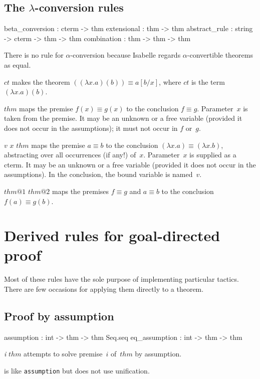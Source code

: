 \subsection{The $\lambda$-conversion rules}
\begin{ttbox} 
beta_conversion : cterm -> thm
extensional     : thm -> thm
abstract_rule   : string -> cterm -> thm -> thm
combination     : thm -> thm -> thm
\end{ttbox} 
There is no rule for $\alpha$-conversion because Isabelle regards
$\alpha$-convertible theorems as equal.
\begin{ttdescription}
\item[\ttindexbold{beta_conversion} $ct$] 
makes the theorem $((\lambda x.a)(b)) \equiv a[b/x]$, where $ct$ is the
term $(\lambda x.a)(b)$.

\item[\ttindexbold{extensional} $thm$] 
maps the premise $f(x) \equiv g(x)$ to the conclusion $f\equiv g$.
Parameter~$x$ is taken from the premise.  It may be an unknown or a free
variable (provided it does not occur in the assumptions); it must not occur
in $f$ or~$g$.

\item[\ttindexbold{abstract_rule} $v$ $x$ $thm$] 
maps the premise $a\equiv b$ to the conclusion $(\lambda x.a) \equiv
(\lambda x.b)$, abstracting over all occurrences (if any!) of~$x$.
Parameter~$x$ is supplied as a cterm.  It may be an unknown or a free
variable (provided it does not occur in the assumptions).  In the
conclusion, the bound variable is named~$v$.

\item[\ttindexbold{combination} $thm@1$ $thm@2$] 
maps the premises $f\equiv g$ and $a\equiv b$ to the conclusion~$f(a)\equiv
g(b)$.
\end{ttdescription}


\section{Derived rules for goal-directed proof}
Most of these rules have the sole purpose of implementing particular
tactics.  There are few occasions for applying them directly to a theorem.

\subsection{Proof by assumption}
\begin{ttbox} 
assumption    : int -> thm -> thm Seq.seq
eq_assumption : int -> thm -> thm
\end{ttbox}
\begin{ttdescription}
\item[\ttindexbold{assumption} {\it i} $thm$] 
attempts to solve premise~$i$ of~$thm$ by assumption.

\item[\ttindexbold{eq_assumption}] 
is like {\tt assumption} but does not use unification.
\end{ttdescription}



